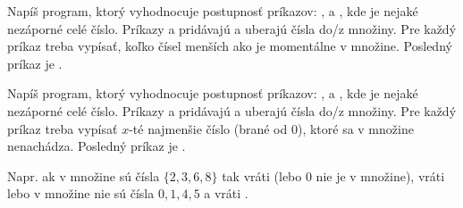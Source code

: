\begin{uloha}
  Napíš program, ktorý vyhodnocuje postupnosť príkazov: , 
  a , kde  je nejaké nezáporné celé číslo. Príkazy  a 
  pridávajú a uberajú čísla do/z množiny. 
  Pre každý príkaz  treba vypísať, koľko čísel 
  menších ako  je momentálne v množine.
  Posledný príkaz je \vb{!}.
\end{uloha}

\begin{uloha}
  Napíš program, ktorý vyhodnocuje postupnosť príkazov: , 
  a , kde  je nejaké nezáporné celé číslo. Príkazy  a 
  pridávajú a uberajú čísla do/z množiny. 
  Pre každý príkaz  treba vypísať $x$-té najmenšie číslo (brané od 0), ktoré
  sa v množine nenachádza.
  Posledný príkaz je \vb{!}.

  
  Napr. ak v množine sú čísla $\{2,3,6,8\}$ tak  vráti  (lebo $0$ nie
  je v množine),  vráti 
  lebo v množine nie sú čísla $0,1,4,5$ a  vráti .
\end{uloha}

